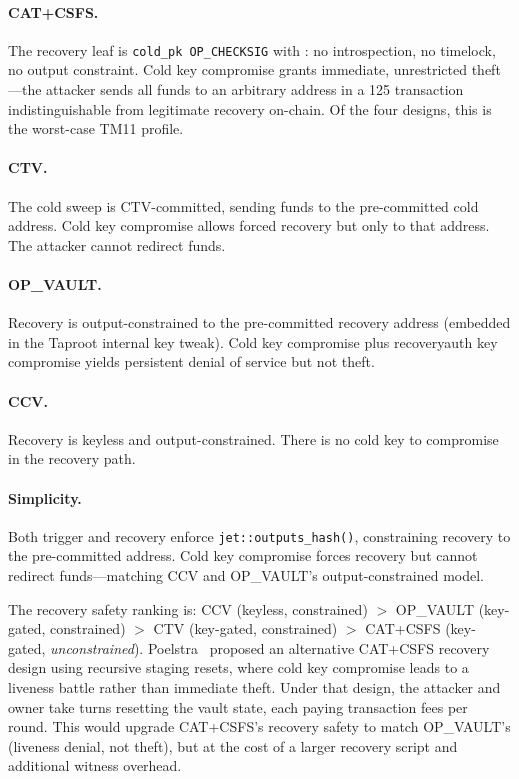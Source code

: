\paragraph{CAT+CSFS.} The recovery leaf is \texttt{cold\_pk
OP\_CHECKSIG} with : no introspection, no
timelock, no output constraint. Cold key compromise grants
immediate, unrestricted theft---the attacker sends all funds to an
arbitrary address in a 125\vB{} transaction indistinguishable from
legitimate recovery on-chain. Of the four designs, this is the
worst-case TM11 profile.

\paragraph{CTV.} The cold sweep is CTV-committed, sending funds to the pre-committed
cold address. Cold key compromise allows forced recovery but only to that address.
The attacker cannot redirect funds.

\paragraph{OP\_VAULT.} Recovery is output-constrained to the pre-committed recovery
address (embedded in the Taproot internal key tweak). Cold key compromise plus
recoveryauth key compromise yields persistent denial of service but not theft.

\paragraph{CCV.} Recovery is keyless and output-constrained. There is no cold key to
compromise in the recovery path.

\paragraph{Simplicity.} Both trigger and recovery enforce
\texttt{jet::outputs\_hash()}, constraining recovery to the pre-committed address.
Cold key compromise forces recovery but cannot redirect funds---matching CCV and
OP\_VAULT's output-constrained model.

The recovery safety ranking is: CCV (keyless, constrained) $>$ OP\_VAULT
(key-gated, constrained) $>$ CTV (key-gated, constrained) $>$ CAT+CSFS
(key-gated, \emph{unconstrained}). Poelstra~\cite{Poe21} proposed an alternative
CAT+CSFS recovery design using recursive staging resets, where cold key compromise
leads to a liveness battle rather than immediate theft. Under that design, the
attacker and owner take turns resetting the vault state, each paying transaction fees
per round. This would upgrade CAT+CSFS's recovery safety to match OP\_VAULT's
(liveness denial, not theft), but at the cost of a larger recovery script and
additional witness overhead.


